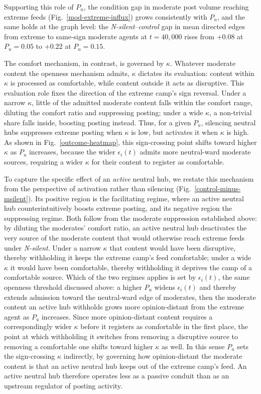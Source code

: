 \documentclass{svproc}
\def\BoundedConfidence{\epsilon} %
\def\VCR{\kappa}                 %
\begin{document}
Supporting this role of $P_u$, the condition gap in moderate post
volume reaching extreme feeds (Fig.~\ref{mod-extreme-influx}) grows
consistently with $P_u$, and the same holds at the graph level: the
\emph{N-silent}--\emph{control} gap in mean directed edges from
extreme to same-sign moderate agents at $t=40{,}000$ rises from
$+0.08$ at $P_u=0.05$ to $+0.22$ at $P_u=0.15$.
\par



The comfort mechanism, in contrast, is governed by $\VCR$. Whatever
moderate content the openness mechanism admits, $\VCR$ dictates
its evaluation: content within $\VCR$ is processed as comfortable,
while content outside it acts as disruptive. This evaluation role
fixes the direction of the extreme camp's sign reversal. Under a
narrow $\VCR$, little of the admitted moderate content falls
within the comfort range, diluting the comfort ratio and suppressing
posting; under a wide $\VCR$, a non-trivial share falls inside,
boosting posting instead. Thus, for a given $P_u$, silencing neutral
hubs suppresses extreme posting when $\VCR$ is low, but activates it
when $\VCR$ is high. As shown in Fig.~\ref{outcome-heatmap}, this
sign-crossing point shifts toward higher $\VCR$ as $P_u$ increases,
because the wider $\BoundedConfidence_i(t)$ admits more neutral-ward
moderate sources, requiring a wider $\VCR$ for their content to
register as comfortable.
\par


To capture the specific effect of an \emph{active} neutral hub, we
restate this mechanism from the perspective of activation rather than
silencing (Fig.~\ref{control-minus-msilent}). Its positive region is
the facilitating regime, where an active neutral hub
counterintuitively boosts extreme posting, and its negative region the
suppressing regime. Both follow from the moderate suppression
established above: by diluting the moderates' comfort ratio, an active
neutral hub deactivates the very source of the moderate content that
would otherwise reach extreme feeds under \emph{N-silent}. Under a
narrow $\VCR$ that content would have been disruptive, thereby withholding
it keeps the extreme camp's feed comfortable; under a wide $\VCR$ it
would have been comfortable, thereby withholding it deprives the camp of a
comfortable source. Which of the two regimes applies is set by
$\BoundedConfidence_i(t)$, the same openness threshold discussed
above: a higher $P_u$ widens $\BoundedConfidence_i(t)$ and thereby
extends admission toward the neutral-ward edge of moderates, then the
moderate content an active hub withholds grows more opinion-distant
from the extreme agent as $P_u$ increases. Since more opinion-distant
content requires a correspondingly wider $\VCR$ before it registers as
comfortable in the first place, the point at which withholding it
switches from removing a disruptive source to removing a comfortable
one shifts toward higher $\VCR$ as well. In this sense $P_u$ sets the
sign-crossing $\VCR$ indirectly, by governing how opinion-distant the
moderate content is that an active neutral hub keeps out of the
extreme camp's feed. An active neutral hub therefore operates less as
a passive conduit than as an upstream regulator of posting activity.
\end{document}
